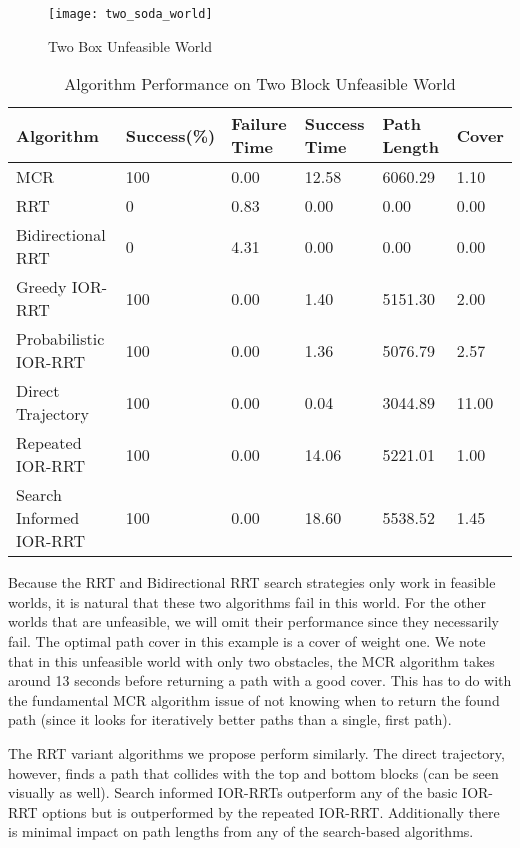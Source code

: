 \begin{figure}[h!]
    \centering
    \texttt{[image: two\_soda\_world]}
    \caption{Two Box Unfeasible World}
    \label{fig:two_soda_world}
\end{figure}

\begin{table}[h!]
\centering
\begin{tabular}{@{}llllll@{}}
\toprule
Algorithm & Success(\%)  & Failure Time  & Success Time  & Path Length & Cover\\ 
\midrule
MCR & 100 & 0.00 & 12.58 & 6060.29 & 1.10 \\
RRT & 0 & 0.83 & 0.00 & 0.00 & 0.00 \\
Bidirectional RRT & 0 & 4.31 & 0.00 & 0.00 & 0.00 \\
Greedy IOR-RRT & 100 & 0.00 & 1.40 & 5151.30 & 2.00 \\
Probabilistic IOR-RRT & 100 & 0.00 & 1.36 & 5076.79 & 2.57 \\
Direct Trajectory & 100 & 0.00 & 0.04 & 3044.89 & 11.00 \\
Repeated IOR-RRT & 100 & 0.00 & 14.06 & 5221.01 & 1.00 \\
Search Informed IOR-RRT & 100 & 0.00 & 18.60 & 5538.52 & 1.45 \\
\bottomrule
\end{tabular}
\caption{Algorithm Performance on Two Block Unfeasible World}
\label{tab:two_soda_world}
\end{table}

Because the RRT and Bidirectional RRT search strategies only work in feasible worlds, it is natural that these two algorithms fail in this world. For the other worlds that are unfeasible, we will omit their performance since they necessarily fail. The optimal path cover in this example is a cover of weight one. We note that in this unfeasible world with only two obstacles, the MCR algorithm takes around 13 seconds before returning a path with a good cover. This has to do with the fundamental MCR algorithm issue of not knowing when to return the found path (since it looks for iteratively better paths than a single, first path). 

The RRT variant algorithms we propose perform similarly. The direct trajectory, however, finds a path that collides with the top and bottom blocks (can be seen visually as well). Search informed IOR-RRTs outperform any of the basic IOR-RRT options but is outperformed by the repeated IOR-RRT. Additionally there is minimal impact on path lengths from any of the search-based algorithms.

